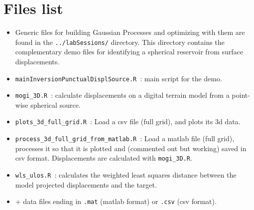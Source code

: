 \documentclass[12pt]{article}
\begin{document}
\section{Files list}
\begin{itemize}
\item Generic files for building Gaussian Processes and optimizing with them are found in the \texttt{../labSessions/} directory. This directory
contains the complementary demo files for identifying a spherical reservoir from surface displacements.
\item \texttt{mainInversionPunctualDisplSource.R}~: main script for the demo.
\item \texttt{mogi\_3D.R}~: calculate displacements on a digital terrain model from a point-wise spherical source.
\item \texttt{plots\_3d\_full\_grid.R}~: Load a csv file (full grid), and plots its 3d data.
\item \texttt{process\_3d\_full\_grid\_from\_matlab.R}~: Load a matlab file (full grid), processes it so that it is plotted and (commented out but working) saved in csv format. Displacements are calculated with \texttt{mogi\_3D.R}.
\item \texttt{wls\_ulos.R}~: calculates the weighted least squares distance between the model projected displacements and the target.
\item + data files ending in \texttt{.mat} (matlab format) or \texttt{.csv} (csv format).
\end{itemize}


\end{document}

